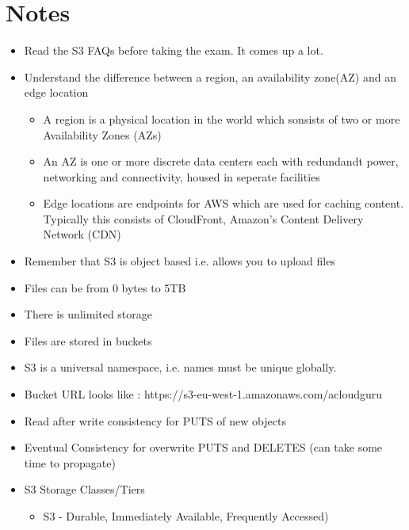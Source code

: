 \documentclass{article}
\begin{document}
\section{Notes}
\begin{itemize}
\item
Read the S3 FAQs before taking the exam. It comes up a lot.

\item
Understand the difference between a region, an availability zone(AZ) and an edge location
	\begin{itemize}
	\item
	A region is a physical location in the world which sonsists of two or more Availability Zones (AZs)

	\item
	An AZ is one or more discrete data centers each with redundandt power, networking and connectivity, housed in seperate facilities

	\item
	Edge locations are endpoints for AWS which are used for caching content. Typically this consists of CloudFront, Amazon's Content Delivery Network (CDN)
\end{itemize}

\item
Remember that S3 is object based i.e. allows you to upload files

\item
Files can be from 0 bytes to 5TB

\item
There is unlimited storage

\item
Files are stored in buckets

\item
S3 is a universal namespace, i.e. names must be unique globally.

\item
Bucket URL looks like : https://s3-eu-west-1.amazonaws.com/acloudguru

\item
Read after write consistency for PUTS of new objects

\item
Eventual Consistency for overwrite PUTS and DELETES (can take some time to propagate)

\item
S3 Storage Classes/Tiers
	\begin{itemize}
	\item
	S3 - Durable, Immediately Available, Frequently Accessed)
	

\end{itemize}
\end{itemize}
\end{document}
